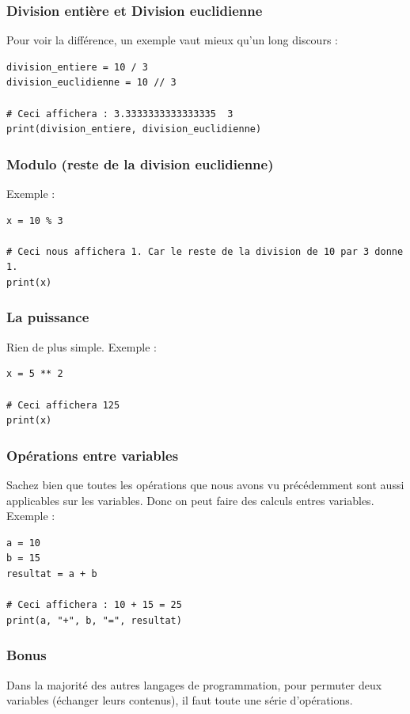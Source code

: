 \documentclass[12pt]{article}
\begin{document}
        \subsubsection{Division entière et Division euclidienne}
            Pour voir la différence, un exemple vaut mieux qu'un long discours :
            \begin{lstlisting}[style=code]
division_entiere = 10 / 3
division_euclidienne = 10 // 3

# Ceci affichera : 3.3333333333333335  3
print(division_entiere, division_euclidienne)
            \end{lstlisting}

        \subsubsection{Modulo (reste de la division euclidienne)}
            Exemple :
            \begin{lstlisting}[style=code, breaklines=false]
x = 10 % 3

# Ceci nous affichera 1. Car le reste de la division de 10 par 3 donne 1.
print(x)
            \end{lstlisting}
        \subsubsection{La puissance}
            Rien de plus simple. Exemple :
            \begin{lstlisting}[style=code]
x = 5 ** 2

# Ceci affichera 125
print(x)
            \end{lstlisting}


        \subsubsection{Opérations entre variables}
            Sachez bien que toutes les opérations que nous avons vu précédemment sont aussi applicables sur les variables.
            Donc on peut faire des calculs entres variables. Exemple :
            \begin{lstlisting}[style=code]
a = 10
b = 15
resultat = a + b

# Ceci affichera : 10 + 15 = 25
print(a, "+", b, "=", resultat)
            \end{lstlisting}

        \subsubsection{Bonus}
            Dans la majorité des autres langages de programmation, pour permuter deux variables
            (échanger leurs contenus), il faut toute une série d'opérations.
\end{document}
